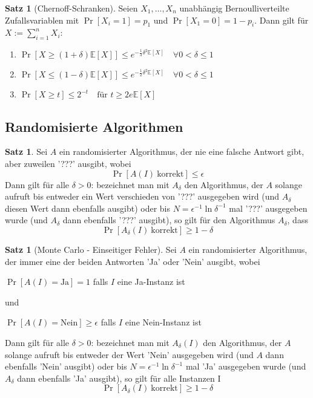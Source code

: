\documentclass[a4paper, 10pt]{article}
\theoremstyle{definition}
\newtheorem{theorem}[definition]{Satz}
\theoremstyle{named}
\begin{document}
\setcounter{definition}{69}
\begin{theorem}[Chernoff-Schranken]
    Seien $X_1, \ldots, X_n$ unabhängig Bernoulliverteilte Zufallsvariablen mit $\Pr[X_i = 1] = p_1$ und $\Pr[X_1 = 0] = 1 - p_i$. Dann gilt für $X := \sum_{i = 1}^n X_i$:
    \begin{enumerate}[label=(\roman*)]
        \item $\Pr[X \geq (1+\delta)\mathbb{E}[X]] \leq e^{-\frac{1}{3}\delta^2\mathbb{E}[X]} \quad \forall 0 < \delta \leq 1$
        \item $\Pr[X \leq (1-\delta)\mathbb{E}[X]] \leq e^{-\frac{1}{2}\delta^2\mathbb{E}[X]} \quad \forall 0 < \delta \leq 1$
        \item $\Pr[X \geq t] \leq 2^{-t} \quad \text{für } t \geq 2e\mathbb{E}[X]$
    \end{enumerate}
\end{theorem}

\setcounter{subsection}{8}
\subsection{Randomisierte Algorithmen}
\setcounter{definition}{71}
\begin{theorem}
    Sei $A$ ein randomisierter Algorithmus, der nie eine falsche Antwort gibt, aber zuweilen '???' ausgibt, wobei $$\Pr[A(I) \ \text{korrekt}] \leq \epsilon$$
    Dann gilt für alle $\delta > 0$: bezeichnet man mit $A_\delta$ den Algorithmus, der $A$ solange aufruft bis entweder ein Wert verschieden von '???' ausgegeben wird (und $A_\delta$ diesen Wert dann ebenfalls ausgibt) oder bis $N = \epsilon^{-1}\ln \delta^{-1}$ mal '???' ausgegeben wurde (und $A_\delta$ dann ebenfalls '???' ausgibt), so gilt für den Algorithmus $A_\delta$, dass 
    $$\Pr[A_\delta(I) \ \text{korrekt}] \geq 1 - \delta$$
\end{theorem}

\setcounter{definition}{73}
\begin{theorem} [Monte Carlo - Einseitiger Fehler]
    Sei $A$ ein randomisierter Algorithmus, der immer eine der beiden Antworten 'Ja' oder 'Nein' ausgibt, wobei
    \begin{center}
        $\Pr[A(I) = \text{Ja}] = 1$ falls $I$ eine Ja-Instanz ist
    \end{center}
    und 
    \begin{center}
        $\Pr[A(I) = \text{Nein}] \geq \epsilon$ falls $I$ eine Nein-Instanz ist
    \end{center}
    Dann gilt für alle $\delta > 0$: bezeichnet man mit $A_\delta(I)$ den Algorithmus, der $A$ solange aufruft bis entweder der Wert 'Nein' ausgegeben wird (und $A$ dann ebenfalls 'Nein' ausgibt) oder bis $N = \epsilon^{-1} \ln \delta^{-1}$ mal 'Ja' ausgegeben wurde (und $A_\delta$ dann ebenfalls 'Ja' ausgibt), so gilt für alle Instanzen I
    $$\Pr[A_\delta(I) \ \text{korrekt}] \geq 1 - \delta$$
\end{theorem}
\end{document}
